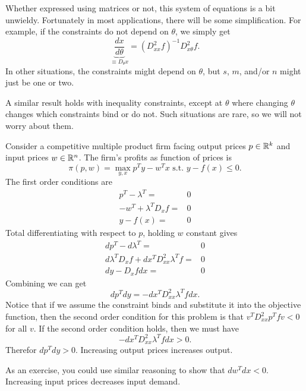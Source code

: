 Whether expressed using matrices or not, this system of equations is a
bit unwieldy. Fortunately in most applications, there will be some
simplification. For example, if the constraints do not depend on
$\theta$, we simply get 
\[ \underbrace{\frac{dx}{d\theta}}_{\equiv D_\theta x} = (D^2_{xx}
f)^{-1} D^2_{x\theta} f. \]
In other situations, the constraints might depend on $\theta$, but
$s$, $m$, and/or $n$ might just be one or two. 

A similar result holds with inequality constraints, except at $\theta$
where changing $\theta$ changes which constraints bind or do not. Such
situations are rare, so we will not worry about them.

\begin{example}
  Consider a competitive multiple product firm facing output prices $p
  \in \mathbb{R}^k$ and input
  prices $w \in \mathbb{R}^n$. The firm's profits as function of prices is
  \[ \pi(p,w) = \max_{y,x} p^T y - w^T x \text{ s.t. } y - f(x) \leq
  0. \]
  The first order conditions are
  \begin{align*}
    p^T - \lambda^T = & 0 \\
    -w^T + \lambda^T D_xf = & 0 \\
    y - f(x) = & 0 
  \end{align*}
  Total differentiating with respect to $p$, holding $w$ constant gives
  \begin{align*}
    dp^T - d\lambda^T = & 0 \\
    d\lambda^T D_x f  +  dx^T D^2_{xx}\lambda^T f  = & 0 \\
    dy - D_xf dx = & 0
  \end{align*}
  Combining we can get
  \[ dp^T dy = -dx^T D^2_{xx} \lambda^T f dx. \]
  Notice that if we assume the constraint binds and substitute it into
  the objective function, then the second order condition for this
  problem is that $v^T D^2_{xx} p^T f v < 0$ for all $v$. If the
  second order condition holds, then we must have 
  \[ -dx^T D^2_{xx} \lambda^T f dx > 0. \]
  Therefor $dp^T dy > 0$. Increasing output prices increases output. 
  
  As an exercise, you could use similar reasoning to show that $dw^T
  dx < 0$. Increasing input prices decreases input demand.
\end{example} 

